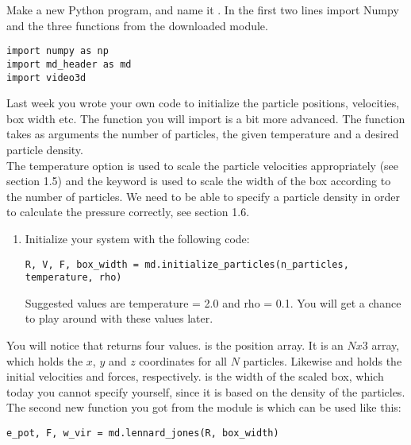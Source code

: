 \documentclass{article}
\begin{document}
Make a new Python program, and name it .
In the first two lines import Numpy and the three functions from the downloaded module.

\begin{lstlisting}
import numpy as np
import md_header as md
import video3d
\end{lstlisting}

Last week you wrote your own code to initialize the particle positions, velocities, box width etc.
The  function you will import is a bit more advanced.
%
The function takes as arguments the number of particles, the given temperature and a desired particle density.\\

The temperature option is used to scale the particle velocities appropriately (see section 1.5) and the  keyword is used to scale the width of the box according to the number of particles.
We need to be able to specify a particle density in order to calculate the pressure correctly, see section 1.6.

\begin{enumerate}

    \item Initialize your system with the following code:

\begin{lstlisting}
R, V, F, box_width = md.initialize_particles(n_particles, temperature, rho)
\end{lstlisting}

        Suggested values are temperature = 2.0 and rho = 0.1.
        You will get a chance to play around with these values later.

\end{enumerate}

You will notice that  returns four values.
 is the position array.
It is an $Nx3$ array, which holds the $x$, $y$ and $z$ coordinates for all $N$ particles.
Likewise  and  holds the initial velocities and forces, respectively.
 is the width of the scaled box, which today you cannot specify yourself,
since it is based on the density of the particles.\\

The second new function you got from the  module is  which can be used like this:

\begin{lstlisting}
e_pot, F, w_vir = md.lennard_jones(R, box_width)
\end{lstlisting}
\end{document}
